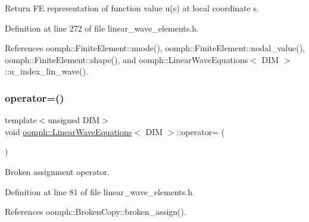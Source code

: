 Return FE representation of function value u(s) at local coordinate s. 



Definition at line 272 of file linear\+\_\+wave\+\_\+elements.\+h.



References oomph\+::\+Finite\+Element\+::nnode(), oomph\+::\+Finite\+Element\+::nodal\+\_\+value(), oomph\+::\+Finite\+Element\+::shape(), and oomph\+::\+Linear\+Wave\+Equations$<$ D\+I\+M $>$\+::u\+\_\+index\+\_\+lin\+\_\+wave().

\mbox{\label{classoomph_1_1LinearWaveEquations_af112a0fd4a6801de7046132bf12dc6df}} 
\subsubsection{\texorpdfstring{operator=()}{operator=()}}
{\footnotesize\ttfamily template$<$unsigned D\+IM$>$ \\
void \hyperlink{classoomph_1_1LinearWaveEquations}{oomph\+::\+Linear\+Wave\+Equations}$<$ D\+IM $>$\+::operator= (\begin{DoxyParamCaption}\item[{const \hyperlink{classoomph_1_1LinearWaveEquations}{Linear\+Wave\+Equations}$<$ D\+IM $>$ \&}]{ }\end{DoxyParamCaption})\hspace{0.3cm}{\ttfamily [inline]}}



Broken assignment operator. 



Definition at line 81 of file linear\+\_\+wave\+\_\+elements.\+h.



References oomph\+::\+Broken\+Copy\+::broken\+\_\+assign().

\mbox{\label{classoomph_1_1LinearWaveEquations_ad5d68d2b3ec9fe3c6102ae91b9c61cc6}} 
